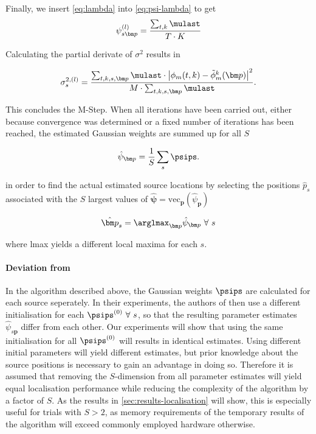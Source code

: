 Finally, we insert \eqref{eq:lambda} into \eqref{eq:psi-lambda} to get
\begin{equation}\label{eq:m_step_psi}
    \psi_{s\bm p}^{(l)}=\frac{\sum_{t,k}\mulast}{T\cdot K}
\end{equation}

Calculating the partial derivate of $\sigma^2$ results in

\begin{equation}\label{eq:m_step_var}
    \sigma_s^{2,(l)}=\frac{\sum_{t,k,s,\bm p}\mulast\cdot\left | \phi_m(t,k)-\tilde\phi_m^k(\bm p)\right |^2}{M\cdot \sum_{t,k,s,\bm p}\mulast}.
\end{equation}

This concludes the M-Step. When all iterations have been carried out, either because convergence was determined or a fixed number of iterations has been reached, the estimated Gaussian weights are summed up for all $S$

\begin{equation}
    \hat\psi_{\bm p} = \frac{1}{S}\sum_{s}\psips.
\end{equation}

in order to find the actual estimated source locations by selecting the positions $\hat p_s$ associated with the $S$ largest values of $\hat{\bm\psi} = \text{vec}_{\bm p}(\hat\psi_{\bm p})$

\begin{equation}\label{eq:find_positions}
    \hat{\bm p}_s=\arglmax_{\bm p}\hat{\psi}_{\bm p}\ \forall\ s
\end{equation}

where lmax yields a different local maxima for each $s$.



\paragraph{Deviation from \cite{Schwartz2014}}
In the algorithm described above, the Gaussian weights $\psips$ are calculated for each source seperately. In their experiments, the authors of \cite{Schwartz2014} then use a different initialisation for each $\psips^{\text{(0)}}\ \forall\ s$, so that the resulting parameter estimates $\hat\psi_{s\bm p}$ differ from each other. Our experiments will show that using the same initialisation for all $\psips^{\text{(0)}}$ will results in identical estimates. Using different initial parameters will yield different estimates, but prior knowledge about the source positions is necessary to gain an advantage in doing so. Therefore it is assumed that removing the $S$-dimension from all parameter estimates will yield equal localisation performance while reducing the complexity of the algorithm by a factor of $S$. As the results in \autoref{sec:results-localisation} will show, this is especially useful for trials with $S>2$, as memory requirements of the temporary results of the algorithm will exceed commonly employed hardware otherwise.

